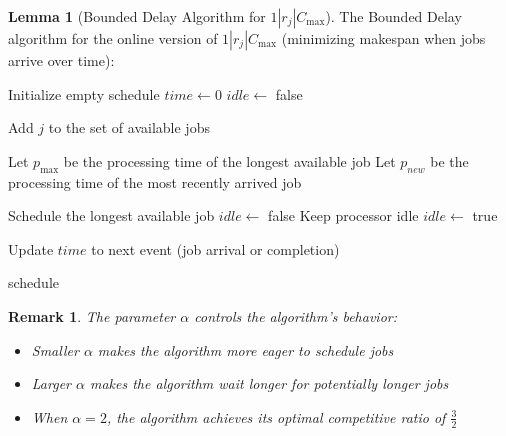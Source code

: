 \documentclass{article}
\newtheorem{remark}{Remark}
\theoremstyle{definition}
\newtheorem{lemma}{Lemma}
\begin{document}
\begin{lemma}[Bounded Delay Algorithm for $1|r_j|C_{\max}$]
The Bounded Delay algorithm for the online version of $1|r_j|C_{\max}$ (minimizing makespan when jobs arrive over time):

\begin{algorithm}
\caption{Bounded Delay Algorithm}
\begin{algorithmic}[1]
    \State Initialize empty schedule
    \State $time \gets 0$
    \State $idle \gets$ false
    
            \State Add $j$ to the set of available jobs
        \EndIf
        
            \State Let $p_{\max}$ be the processing time of the longest available job
            \State Let $p_{new}$ be the processing time of the most recently arrived job
            
                \State Schedule the longest available job
                \State $idle \gets$ false
            \Else
                \State Keep processor idle
                \State $idle \gets$ true
            \EndIf
        \EndIf
        
        \State Update $time$ to next event (job arrival or completion)
    \EndWhile
    
    \State \Return schedule
\EndProcedure
\end{algorithmic}
\end{algorithm}

\begin{remark}
The parameter $\alpha$ controls the algorithm's behavior:
\begin{itemize}
    \item Smaller $\alpha$ makes the algorithm more eager to schedule jobs
    \item Larger $\alpha$ makes the algorithm wait longer for potentially longer jobs
    \item When $\alpha = 2$, the algorithm achieves its optimal competitive ratio of $\frac{3}{2}$
\end{itemize}
\end{remark}
\end{lemma}
\end{document}
